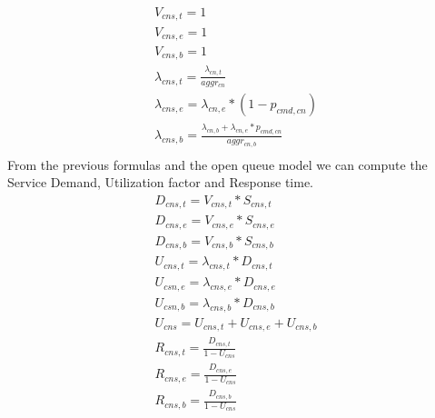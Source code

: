 \documentclass[11pt]{article}
\begin{document}
\begin{equation}
	\begin{array}{l}
		V_{cns, t} = 1 \\
		V_{cns, e} = 1 \\
		V_{cns, b} = 1 \\
		\lambda_{cns, t} = \frac{\lambda_{cn,t}}{aggr_{cn}} \\
		\lambda_{cns, e} = \lambda_{cn,e} * (1-p_{cmd,cn}) \\
		\lambda_{cns, b} = \frac{\lambda_{cn,b}+\lambda_{cn,e}*p_{cmd,cn}}{aggr_{cn,b}} \\
	\end{array}
\end{equation}
From the previous formulas and the open queue model we can compute the Service Demand, Utilization factor and Response time.
\begin{equation}
	\begin{array}{l}
		D_{cns, t} = V_{cns, t} * S_{cns, t} \\
		D_{cns, e} = V_{cns, e} * S_{cns, e} \\
		D_{cns, b} = V_{cns, b} * S_{cns, b} \\
		U_{cns, t} = \lambda_{cns, t} * D_{cns, t} \\
		U_{csn, e} = \lambda_{cns, e} * D_{cns, e} \\
		U_{csn, b} = \lambda_{cns, b} * D_{cns, b} \\
		U_{cns} = U_{cns, t} + U_{cns, e} + U_{cns, b}\\
		R_{cns, t} = \frac{D_{cns, t}}{1 - U_{cns}} \\
		R_{cns, e} = \frac{D_{cns, e}}{1 - U_{cns}} \\
		R_{cns, b} = \frac{D_{cns, b}}{1 - U_{cns}} \\
	\end{array}
\end{equation}
\end{document}
